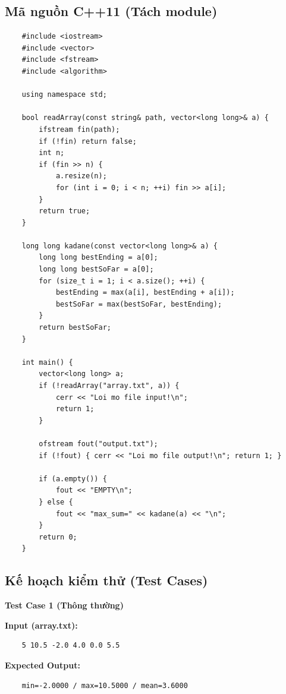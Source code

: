 \subsection{Mã nguồn C++11 (Tách module)}
    \begin{lstlisting}
    #include <iostream>
    #include <vector>
    #include <fstream>
    #include <algorithm>

    using namespace std;

    bool readArray(const string& path, vector<long long>& a) {
        ifstream fin(path);
        if (!fin) return false;
        int n;
        if (fin >> n) {
            a.resize(n);
            for (int i = 0; i < n; ++i) fin >> a[i];
        }
        return true;
    }

    long long kadane(const vector<long long>& a) {
        long long bestEnding = a[0];
        long long bestSoFar = a[0];
        for (size_t i = 1; i < a.size(); ++i) {
            bestEnding = max(a[i], bestEnding + a[i]);
            bestSoFar = max(bestSoFar, bestEnding);
        }
        return bestSoFar;
    }

    int main() {
        vector<long long> a;
        if (!readArray("array.txt", a)) {
            cerr << "Loi mo file input!\n";
            return 1;
        }

        ofstream fout("output.txt");
        if (!fout) { cerr << "Loi mo file output!\n"; return 1; }

        if (a.empty()) {
            fout << "EMPTY\n";
        } else {
            fout << "max_sum=" << kadane(a) << "\n";
        }
        return 0;
    }
\end{lstlisting}

\subsection{Kế hoạch kiểm thử (Test Cases)}

    \textbf{Test Case 1 (Thông thường)}

    \textbf{Input (array.txt):}
    \begin{lstlisting}
    5 10.5 -2.0 4.0 0.0 5.5\end{lstlisting}

    \textbf{Expected Output:}
    \begin{lstlisting}
    min=-2.0000 / max=10.5000 / mean=3.6000\end{lstlisting}

    \vspace{0.5cm}

